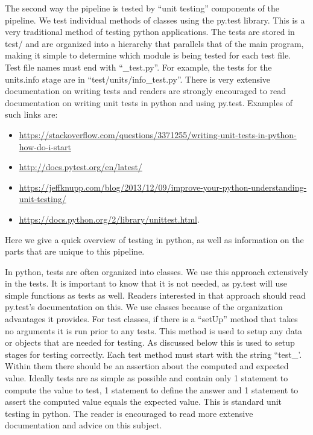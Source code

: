The second way the pipeline is tested by ``unit testing'' components of the
pipeline. We test individual methods of classes using the py.test library. This
is a very traditional method of testing python applications. The tests are
stored in test/ and are organized into a hierarchy that parallels that of the
main program, making it simple to determine which module is being tested for
each test file. Test file names must end with ``\_test.py''. For example, the
tests for the units.info stage are in ``test/units/info\_test.py''.  There is very
extensive documentation on writing tests and readers are strongly encouraged to
read documentation on writing unit tests in python and using py.test. Examples
of such links are: 
\begin{itemize}
  \item \url{https://stackoverflow.com/questions/3371255/writing-unit-tests-in-python-how-do-i-start}
  \item \url{http://docs.pytest.org/en/latest/}
  \item \url{https://jeffknupp.com/blog/2013/12/09/improve-your-python-understanding-unit-testing/}
  \item \url{https://docs.python.org/2/library/unittest.html}.
\end{itemize}

Here we give a quick overview of testing in python, as well as information on
the parts that are unique to this pipeline.

In python, tests are often organized into classes. We use this approach
extensively in the tests. It is important to know that it is not needed, as
py.test will use simple functions as tests as well. Readers interested in that
approach should read py.test's documentation on this. We use classes because of
the organization advantages it provides. For test classes, if there is a ``setUp''
method that takes no arguments it is run prior to any tests. This method is used
to setup any data or objects that are needed for testing. As discussed below
this is used to setup stages for testing correctly. Each test method must start
with the string ``test\_'. Within them there should be an assertion about the
computed and expected value. Ideally tests are as simple as possible and contain
only 1 statement to compute the value to test, 1 statement to define the answer
and 1 statement to assert the computed value equals the expected value. This is
standard unit testing in python. The reader is encouraged to read more extensive
documentation and advice on this subject.

